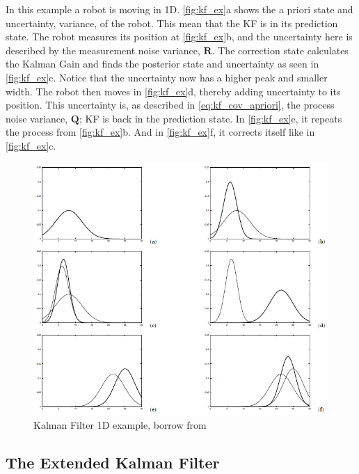 \documentclass[Main]{subfiles}
\begin{document}
In this example a robot is moving in 1D.
\autoref{fig:kf_ex}a shows the a priori state and uncertainty, variance, of the robot.
This mean that the KF is in its prediction state.
The robot measures its position at \autoref{fig:kf_ex}b, and the uncertainty here is described by the measurement noise variance, $\mathbf{R}$.
The correction state calculates the Kalman Gain and finds the posterior state and uncertainty as seen in \autoref{fig:kf_ex}c.
Notice that the uncertainty now has a higher peak and smaller width.
The robot then moves in \autoref{fig:kf_ex}d, thereby adding uncertainty to its position.
This uncertainty is, as described in \autoref{eq:kf_cov_apriori}, the process noise variance, $\mathbf{Q}$; KF is back in the prediction state.
In \autoref{fig:kf_ex}e, it repeats the process from \autoref{fig:kf_ex}b.
And in \autoref{fig:kf_ex}f, it corrects itself like in \autoref{fig:kf_ex}c.
\begin{figure}[H]
	\centering
	\includegraphics[width=0.8\linewidth]{./Figures/kf_ex.png}
	\caption{Kalman Filter 1D example, borrow from \citep{Thrun2002}}
	\label{fig:kf_ex}
\end{figure}\noindent

\subsection{The Extended Kalman Filter}
\end{document}
